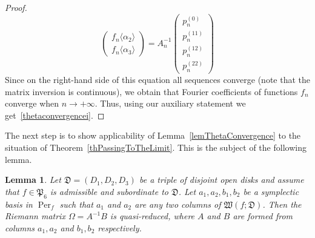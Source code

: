 \documentclass{amsart}
\numberwithin{equation}{section}
\newtheorem{lemma}[theorem]{Lemma}
\theoremstyle{definition}
\theoremstyle{remark}
\DeclareMathOperator{\Per}{Per}
\begin{document}
\begin{proof}
\[\begin{pmatrix}
			f_n\langle \alpha_2 \rangle \\ f_n\langle \alpha_3 \rangle
		\end{pmatrix} = A_n^{-1}
		\begin{pmatrix}
			p_n^{(0)} \\ p_n^{(11)} \\ p_n^{(12)} \\ p_n^{(22)}
		\end{pmatrix}
		\]
		Since on the right-hand side of this equation all sequences converge (note that the matrix inversion is continuous), we obtain that Fourier coefficients of functions $f_n$ converge when $n \to +\infty$. Thus, using our auxiliary statement we get~\ref{thetaconvergencei}.
	\end{proof}
	
	The next step is to show applicability of Lemma~\ref{lemThetaConvergence} to the situation of Theorem~\ref{thPassingToTheLimit}. This is the subject of the following lemma.
	
	\begin{lemma}\label{lemQuasiReducedIfSubordinate}
		Let $\mathfrak D = (D_1,D_2,D_3)$ be a triple of disjoint open disks and assume that $f \in \mathfrak P_6$ is admissible and subordinate to $\mathfrak D$. Let $a_1,a_2,b_1,b_2$ be a symplectic basis in $\Per_f$ such that $a_1$ and $a_2$ are any two columns of $\mathfrak W(f;\mathfrak D)$. Then the Riemann matrix $\Omega = A^{-1}B$ is quasi-reduced, where $A$ and $B$ are formed from columns $a_1, a_2$ and $b_1, b_2$ respectively.
	\end{lemma}
	
\end{document}
